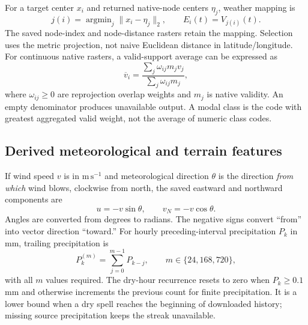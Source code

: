 \documentclass[11pt,a4paper]{article}
\DeclareMathOperator{\argmin}{argmin}
\begin{document}
For a target center $x_i$ and returned native-node centers $\eta_j$, weather
mapping is
\begin{equation}
j(i)=\argmin_j\|x_i-\eta_j\|_2,\qquad E_i(t)=V_{j(i)}(t).
\end{equation}
The saved node-index and node-distance rasters retain the mapping. Selection
uses the metric projection, not naive Euclidean distance in latitude/longitude.
For continuous native rasters, a valid-support average can be expressed as
\begin{equation}
\overline v_i=
\frac{\sum_j \omega_{ij}m_jv_j}{\sum_j\omega_{ij}m_j},
\label{eq:validaverage}
\end{equation}
where $\omega_{ij}\ge0$ are reprojection overlap weights and $m_j$ is native
validity. An empty denominator produces unavailable output. A modal class
is the code with greatest aggregated valid weight, not the average of numeric
class codes.

\subsection{Derived meteorological and terrain features}
If wind speed $v$ is in $\mathrm{m\,s^{-1}}$ and meteorological direction
$\theta$ is the direction \emph{from which} wind blows, clockwise from north,
the saved eastward and northward components are
\begin{equation}
u=-v\sin\theta,\qquad v_N=-v\cos\theta.
\end{equation}
Angles are converted from degrees to radians. The negative signs convert
``from'' into vector direction ``toward.'' For hourly preceding-interval
precipitation $P_k$ in mm, trailing precipitation is
\begin{equation}
P_k^{(m)}=\sum_{j=0}^{m-1}P_{k-j},\qquad m\in\{24,168,720\},
\end{equation}
with all $m$ values required. The dry-hour recurrence resets to zero when
$P_k\ge0.1$ mm and otherwise increments the previous count for finite
precipitation. It is a lower bound when a dry spell reaches the beginning of
downloaded history; missing source precipitation keeps the streak unavailable.
\end{document}
